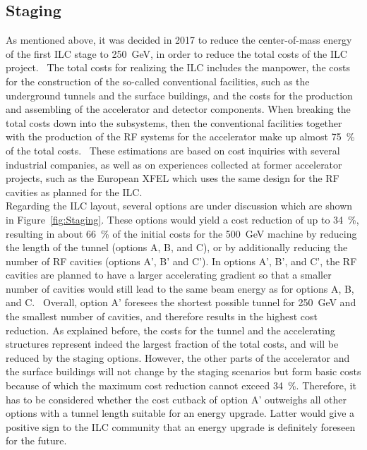 \subsection{Staging}
As mentioned above, it was decided in 2017 to reduce the center-of-mass energy of the first ILC stage to \SI{250}{\GeV}, in order to reduce the total costs of the ILC project.~\cite{ICFA_Statement}
The total costs for realizing the ILC includes the manpower, the costs for the construction of the so-called conventional facilities, such as the underground tunnels and the surface buildings, and the costs for the production and assembling of the accelerator and detector components.
When breaking the total costs down into the subsystems, then the conventional facilities together with the production of the RF systems for the accelerator make up almost \SI{75}{\percent} of the total costs.~\cite[p. 20f]{TDR1}
These estimations are based on cost inquiries with several industrial companies, as well as on experiences collected at former accelerator projects, such as the European XFEL which uses the same design for the RF cavities as planned for the ILC.\\
Regarding the ILC layout, several options are under discussion which are shown in Figure~\ref{fig:Staging}.
These options would yield a cost reduction of up to \SI{34}{\percent}, resulting in about \SI{66}{\percent} of the initial costs for the \SI{500}{\GeV} machine by reducing the length of the tunnel (options A, B, and C), or by additionally reducing the number of RF cavities (options A', B' and C').
In options A', B', and C', the RF cavities are planned to have a larger accelerating gradient so that a smaller number of cavities would still lead to the same beam energy as for options A, B, and C.~\cite{Cost_reduction}
Overall, option A' foresees the shortest possible tunnel for \SI{250}{\GeV} and the smallest number of cavities, and therefore results in the highest cost reduction.
As explained before, the costs for the tunnel and the accelerating structures represent indeed the largest fraction of the total costs, and will be reduced by the staging options.
However, the other parts of the accelerator and the surface buildings will not change by the staging scenarios but form basic costs because of which the maximum cost reduction cannot exceed \SI{34}{\percent}.
Therefore, it has to be considered whether the cost cutback of option A' outweighs all other options with a tunnel length suitable for an energy upgrade.
Latter would give a positive sign to the ILC community that an energy upgrade is definitely foreseen for the future.
